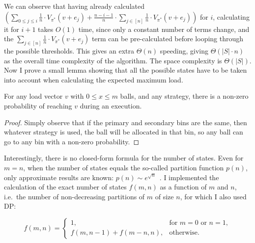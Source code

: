 We can observe that having already calculated $(\sum_{0\leq j \leq i} \frac{1}{n}\cdot V_{\pi^*}(v+e_j) + \frac{n-i-1}{n} \cdot  \sum_{j \in [n]} \frac{1}{n}\cdot V_{\pi^*}(v+e_j))$ for $i$, calculating it for $i+1$ takes $O(1)$ time, since only a constant number of terms change, and the $\sum_{j \in [n]} \frac{1}{n}\cdot V_{\pi^*}(v+e_j)$ term can be pre-calculated before looping through the possible thresholds. This gives an extra $\Theta(n)$ speeding, giving $\Theta(|S|\cdot n)$ as the overall time complexity of the algorithm. The space complexity is $\Theta(|S|)$.\\


Now I prove a small lemma showing that all the possible states have to be taken into account when calculating the expected maximum load.


\begin{lemma} \label{lemma: everystatereachable}
For any load vector $v$ with $0\leq x\leq m$ balls, and any strategy, there is a non-zero probability of reaching $v$ during an execution.
\end{lemma}

\begin{proof}
    Simply observe that if the primary and secondary bins are the same, then whatever strategy is used, the ball will be allocated in that bin, so any ball can go to any bin with a non-zero probability.
\end{proof}




Interestingly, there is no closed-form formula for the number of states.  Even for $m=n$, when the number of states equals the so-called partition function $p(n)$, only approximate results are known: $p(n) \sim e^{\sqrt{n}}$~\cite{hardy1918partitionfunction}. I implemented the calculation of the exact number of states $f(m, n)$ as a function of $m$ and $n$, i.e.\ the number of non-decreasing partitions of $m$ of size $n$, for which I also used DP:

\begin{equation} \label{eq: numberofpartitions}
    f(m, n) = \begin{cases}
        1, & \text{for } m=0\text{ or } n=1,\\
        f(m,n-1)+f(m-n,n), & \text{otherwise}.
    \end{cases}
\end{equation}


